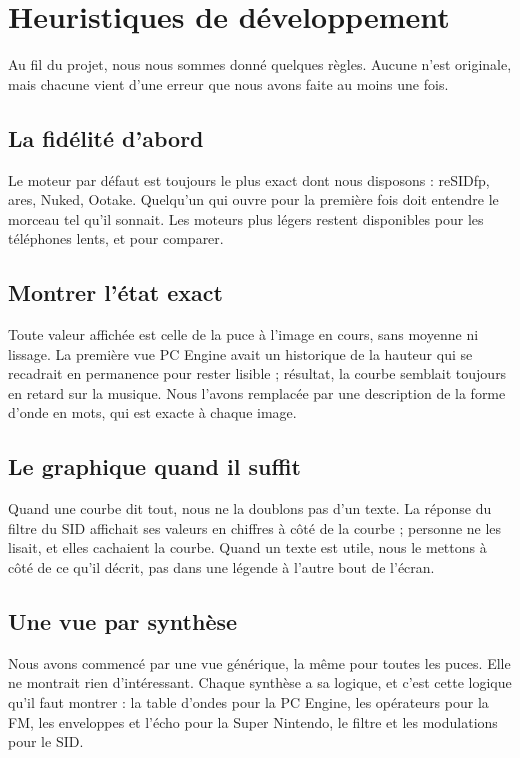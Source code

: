 \chapter{Heuristiques de développement}

Au fil du projet, nous nous sommes donné quelques règles. Aucune n'est originale, mais chacune vient d'une erreur que
nous avons faite au moins une fois.

\section{La fidélité d'abord}
Le moteur par défaut est toujours le plus exact dont nous disposons : reSIDfp, ares, Nuked, Ootake. Quelqu'un qui
ouvre \soft pour la première fois doit entendre le morceau tel qu'il sonnait. Les moteurs plus légers restent
disponibles pour les téléphones lents, et pour comparer.

\section{Montrer l'état exact}
Toute valeur affichée est celle de la puce à l'image en cours, sans moyenne ni lissage. La première vue PC Engine
avait un historique de la hauteur qui se recadrait en permanence pour rester lisible ; résultat, la courbe semblait
toujours en retard sur la musique. Nous l'avons remplacée par une description de la forme d'onde en mots, qui est
exacte à chaque image.

\section{Le graphique quand il suffit}
Quand une courbe dit tout, nous ne la doublons pas d'un texte. La réponse du filtre du SID affichait ses valeurs
en chiffres à côté de la courbe ; personne ne les lisait, et elles cachaient la courbe. Quand un texte est utile,
nous le mettons à côté de ce qu'il décrit, pas dans une légende à l'autre bout de l'écran.

\section{Une vue par synthèse}
Nous avons commencé par une vue générique, la même pour toutes les puces. Elle ne montrait rien d'intéressant. Chaque
synthèse a sa logique, et c'est cette logique qu'il faut montrer : la table d'ondes pour la PC Engine, les opérateurs
pour la FM, les enveloppes et l'écho pour la Super Nintendo, le filtre et les modulations pour le SID.

